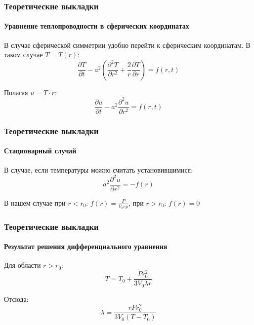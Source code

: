 \documentclass[8pt,pdf,hyperref={unicode}]{beamer}
\begin{document}
	\begin{frame}
		\frametitle{Теоретические выкладки}
		\framesubtitle{Уравнение теплопроводности в сферических координатах}
		\begin{center}
			В случае сферической симметрии удобно перейти к сферическим координатам. В таком случае $T = T(r)$:
			\begin{equation}
				\frac{\partial T}{\partial t} - a^2 (\frac{\partial^2 T}{\partial r^2} + \frac{2}{r} \frac{\partial T}{\partial r})  = f(r, t)
			\end{equation}
	
			Полагая $u = T \cdot r$:
			\begin{equation}
				\frac{\partial u}{\partial t} - a^2 \frac{\partial^2 u}{\partial r^2}  = f(r, t)
			\end{equation} 
		\end{center}
	\end{frame}
	\begin{frame}
		\frametitle{Теоретические выкладки}
		\framesubtitle{Стационарный случай}
		\begin{center}
			В случае, если температуры можно считать установившимися:
			\begin{equation}
			a^2 \frac{\partial^2 u}{\partial r^2}  = - f(r)
			\end{equation}
			
			В нашем случае при $r < r_0$: $f(r) = \frac{P}{V_0 c \rho}$, при $r > r_0$: $f(r) = 0$
		\end{center}
	\end{frame}
	\begin{frame}
		\frametitle{Теоретические выкладки}
		\framesubtitle{Результат решения дифференциального уравнения}
		\begin{center}
			Для области $r > r_0$:
			\begin{equation}
				T = T_0 + \frac{P r_0^2}{3 V_0 \lambda r}
			\end{equation}
			
			Отсюда:
			\begin{equation}
				\lambda = \frac{r P r_0^2}{3 V_0 (T - T_0)}
			\end{equation}
		\end{center}
	\end{frame}
\end{document}

